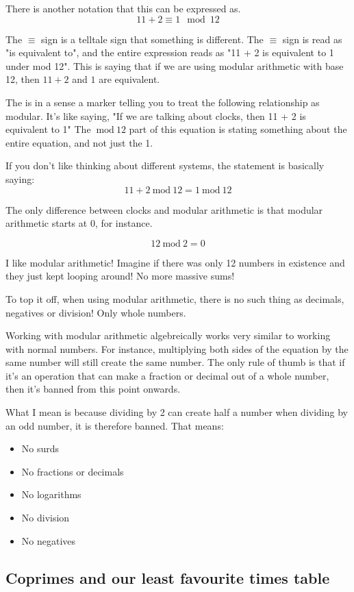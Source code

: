 \documentclass{article}
\newcommand{\inmod}{\ \text{mod}\ }
\begin{document}
  There is another notation that this can be expressed as.
  \[ 11 + 2 \equiv 1 \mod 12 \]

  The $\equiv$ sign is a telltale sign that something is different. The $\equiv$ sign is read as "is equivalent to", and the entire expression reads as "11 + 2 is equivalent to 1 under mod 12". This is saying that if we are using modular arithmetic with base 12, then $11 + 2$ and $1$ are equivalent.

  The  is in a sense a marker telling you to treat the following
  relationship as modular. It's like saying, "If we are talking about clocks, 
  then 11 + 2 is equivalent to 1" The $\inmod 12$ part of this equation is 
  stating something about the entire equation, and not just the 1.

  If you don't like thinking about different systems, the statement is basically saying:
  \[ 11 + 2 \inmod 12 = 1 \inmod 12 \]

  The only difference between clocks and modular arithmetic is that modular arithmetic starts at 0, for instance.

  \[ 12 \inmod 2 = 0 \]

  I like modular arithmetic! Imagine if there was only 12 numbers in existence and they just kept looping around! No more massive sums!

  To top it off, when using modular arithmetic, there is no such thing as decimals, negatives or division! Only whole numbers.

  Working with modular arithmetic algebreically works very similar to working with
  normal numbers. For instance, multiplying both sides of the equation by the same
  number will still create the same number. The only rule of thumb is that if
  it's an operation that can make a fraction or decimal out of a whole number,
  then it's banned from this point onwards. 
  
  What I mean is because dividing by 2 can create half a number when dividing
  by an odd number, it is therefore banned. That means:

  \begin{itemize}
    \item No surds
    \item No fractions or decimals
    \item No logarithms
    \item No division
    \item No negatives
  \end{itemize}
  \subsection*{Coprimes and our least favourite times table}
  
\end{document}
